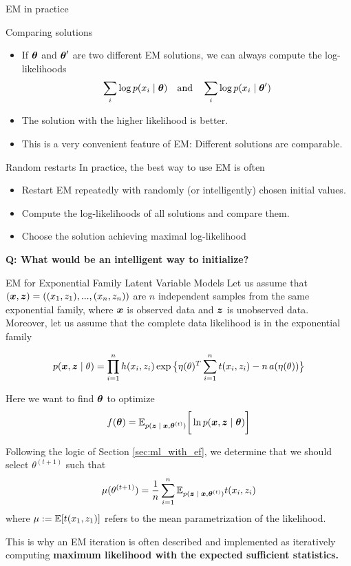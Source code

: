 \documentclass[10pt]{beamer}
\begin{document}
\begin{frame}{EM in practice}
\footnotesize
\begin{sblock}{Comparing solutions}
\begin{itemize}
\item If ${\boldsymbol \theta}$ and ${\boldsymbol \theta}^\prime$ are two different EM solutions, we can always compute the log-likelihoods
\[ \displaystyle\sum_i \log p(x_i \; | \; {\boldsymbol \theta}) \quad \text{and} \quad \displaystyle\sum_i \log p(x_i \; | \; {\boldsymbol \theta}^\prime) \]
\item The solution with the higher likelihood is better.
\item This is a very convenient feature of EM: Different solutions are comparable. 
\end{itemize}
\end{sblock}
\begin{sblock}{Random restarts}
In practice, the best way to use EM is often
\begin{itemize}
\item Restart EM repeatedly with randomly (or intelligently) chosen initial values.
\item Compute the log-likelihoods of all solutions and compare them.
\item Choose the solution achieving maximal log-likelihood
\end{itemize}
\end{sblock}
\vfill
\tiny \bf{Q}: What would be an intelligent way to initialize?
\end{frame}


\begin{frame}{EM for Exponential Family Latent Variable Models}
\scriptsize 
Let us assume that $({\boldsymbol x}, {\boldsymbol z})=((x_1,z_1), ..., (x_n, z_n))$ are $n$ independent samples from the same exponential family, where ${\boldsymbol x}$ is observed data and ${\boldsymbol z}$ is unobserved data.
Moreover, let us assume that the complete data likelihood is in the exponential family

\begin{align}
\label{eqn:exponential_family_complete_data_likelihood}
 p({\boldsymbol x}, {\boldsymbol z} \; | \; \theta) = \displaystyle\prod_{i=1}^n h(x_i, z_i) \exp \big\{ \eta(\theta)^T \sum_{i=1}^n t(x_i, z_i) - n \,a(\eta(\theta))\big\} 
 \end{align}

Here we want to find ${\boldsymbol \theta}$ to optimize 
\[ f({\boldsymbol \theta}) =  \mathbb{E}_{p({\boldsymbol z} \; | \; {\boldsymbol x} , {\boldsymbol \theta}^{(t)})} \bigg[ \ln p({\boldsymbol x}, {\boldsymbol z} \; | \; {\boldsymbol \theta}) \bigg] \]

Following the logic of Section \ref{sec:ml_with_ef}, we determine that we should select $\theta^{(t+1)}$ such that
\[ \mu(\theta^{(t+1)}) = \displaystyle\frac{1}{n} \displaystyle\sum_{i=1}^n   \mathbb{E}_{p({\boldsymbol z} \; | \; {\boldsymbol x} , {\boldsymbol \theta}^{(t)})} t(x_i, z_i) \]
where $\mu := \mathbb{E}[t(x_1,z_1)]$ refers to the mean parametrization of the likelihood.

This is why an EM iteration is often described and  implemented as iteratively computing \bf{maximum likelihood with the expected sufficient statistics.}
\end{frame}
\end{document}
